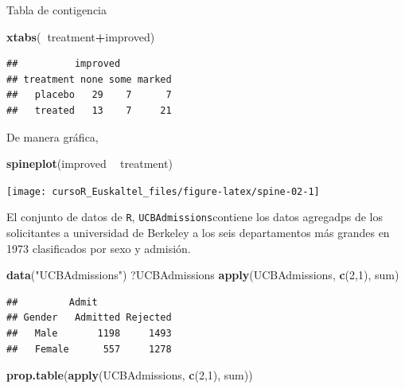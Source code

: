 \documentclass[]{book}
\newenvironment{Shaded}{\begin{snugshade}}{\end{snugshade}}
\newcommand{\KeywordTok}[1]{\textcolor[rgb]{0.13,0.29,0.53}{\textbf{#1}}}
\newcommand{\DecValTok}[1]{\textcolor[rgb]{0.00,0.00,0.81}{#1}}
\newcommand{\StringTok}[1]{\textcolor[rgb]{0.31,0.60,0.02}{#1}}
\newcommand{\OperatorTok}[1]{\textcolor[rgb]{0.81,0.36,0.00}{\textbf{#1}}}
\newcommand{\NormalTok}[1]{#1}
\begin{document}
Tabla de contigencia

\begin{Shaded}
\begin{Highlighting}[]
\KeywordTok{xtabs}\NormalTok{(}\OperatorTok{~}\NormalTok{treatment}\OperatorTok{+}\NormalTok{improved)}
\end{Highlighting}
\end{Shaded}

\begin{verbatim}
##          improved
## treatment none some marked
##   placebo   29    7      7
##   treated   13    7     21
\end{verbatim}

De manera gráfica,

\begin{Shaded}
\begin{Highlighting}[]
\KeywordTok{spineplot}\NormalTok{(improved }\OperatorTok{~}\StringTok{ }\NormalTok{treatment)}
\end{Highlighting}
\end{Shaded}

\begin{center}\texttt{[image: cursoR\_Euskaltel\_files/figure-latex/spine-02-1]} \end{center}

El conjunto de datos de \texttt{R}, \texttt{UCBAdmissions}contiene los
datos agregadps de los solicitantes a universidad de Berkeley a los seis
departamentos más grandes en 1973 clasificados por sexo y admisión.

\begin{Shaded}
\begin{Highlighting}[]
\KeywordTok{data}\NormalTok{(}\StringTok{"UCBAdmissions"}\NormalTok{)}
\NormalTok{?UCBAdmissions}
\KeywordTok{apply}\NormalTok{(UCBAdmissions, }\KeywordTok{c}\NormalTok{(}\DecValTok{2}\NormalTok{,}\DecValTok{1}\NormalTok{), sum)}
\end{Highlighting}
\end{Shaded}

\begin{verbatim}
##         Admit
## Gender   Admitted Rejected
##   Male       1198     1493
##   Female      557     1278
\end{verbatim}

\begin{Shaded}
\begin{Highlighting}[]
\KeywordTok{prop.table}\NormalTok{(}\KeywordTok{apply}\NormalTok{(UCBAdmissions, }\KeywordTok{c}\NormalTok{(}\DecValTok{2}\NormalTok{,}\DecValTok{1}\NormalTok{), sum))}
\end{Highlighting}
\end{Shaded}
\end{document}
